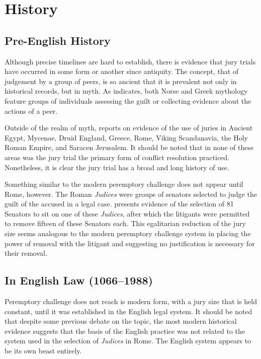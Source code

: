 \section{History} \label{sec:history}

\subsection{Pre-English History}

Although precise timelines are hard to establish, there is evidence that jury trials have occurred in some form or another since
antiquity. The concept, that of judgement by a group of peers, is so ancient that it is prevalent not only in historical records,
but in myth. As \cite{hoffman1997} indicates, both Norse and Greek mythology feature groups of individuals assessing the guilt or
collecting evidence about the actions of a peer.

Outside of the realm of myth, \cite{hoffman1997} reports on evidence of the use of juries in Ancient Egypt, Mycenae, Druid
England, Greece, Rome, Viking Scandanavia, the Holy Roman Empire, and Saracen Jerusalem. It should be noted that in none of these
areas was the jury trial the primary form of conflict resolution practiced. Nonetheless, it is clear the jury trial has a broad
and long history of use.

Something similar to the modern peremptory challenge does not appear until Rome, however. The Roman \textit{Judices} were groups
of senators selected to judge the guilt of the accused in a legal case. \cite{hoffman1997} presents evidence of the selection of
81 Senators to sit on one of these \textit{Judices}, after which the litigants were permitted to remove fifteen of these Senators
each. This egalitarian reduction of the jury size seems analogous to the modern peremptory challenge system in placing the power
of removal with the litigant and suggesting no justification is necessary for their removal.

\subsection{In English Law (1066--1988)}

Peremptory challenge does not reach is modern form, with a jury size that is held constant, until it was established in the
English legal system. It should be noted that despite some previous debate on the topic, the most modern historical evidence
suggests that the basis of the English practice was not related to the system used in the selection of \textit{Judices} in
Rome. The English system appears to be its own beast entirely.

